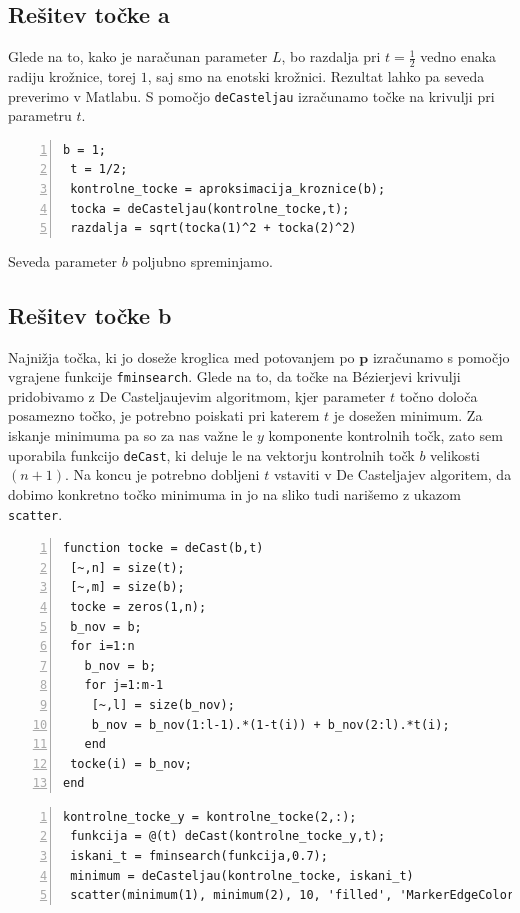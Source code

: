 \documentclass[a4paper,12pt]{article}
\begin{document}
	\subsection{Rešitev točke a}

	Glede na to, kako je naračunan parameter $L$, bo razdalja pri $t=\frac{1}{2}$ vedno enaka radiju krožnice, torej $1$, saj smo na enotski
	krožnici. Rezultat lahko pa seveda preverimo v Matlabu. S pomočjo \lstinline[style=Matlab-editor]!deCasteljau! izračunamo točke na krivulji pri
	parametru $t$.

	\begin{lstlisting}[style=Matlab-editor,	numbers=left,]
 b = 1;
 t = 1/2;
 kontrolne_tocke = aproksimacija_kroznice(b);
 tocka = deCasteljau(kontrolne_tocke,t);
 razdalja = sqrt(tocka(1)^2 + tocka(2)^2)
	\end{lstlisting}

	\noindent Seveda parameter $b$ poljubno spreminjamo. 

	\subsection{Rešitev točke b}
	Najnižja točka, ki jo doseže kroglica med potovanjem po $\boldsymbol{p}$ izračunamo s pomočjo vgrajene funkcije \lstinline[style=Matlab-editor]!fminsearch!. Glede na to, da točke na 
	B\'ezierjevi krivulji pridobivamo z De Casteljaujevim algoritmom, kjer parameter $t$ točno določa posamezno točko, je potrebno poiskati pri katerem $t$ je dosežen minimum. Za iskanje minimuma pa so
	za nas važne le $y$ komponente kontrolnih točk, zato sem uporabila funkcijo \lstinline[style=Matlab-editor]!deCast!, ki deluje le na vektorju kontrolnih točk $b$ velikosti $(n+1)$. Na koncu je potrebno dobljeni $t$ vstaviti v  
	De Casteljajev algoritem, da dobimo konkretno točko minimuma in jo na sliko tudi narišemo z ukazom \lstinline[style=Matlab-editor]!scatter!.

	\begin{lstlisting}[style=Matlab-editor,	numbers=left,]
function tocke = deCast(b,t)
 [~,n] = size(t);
 [~,m] = size(b);
 tocke = zeros(1,n);
 b_nov = b;
 for i=1:n
   b_nov = b;
   for j=1:m-1
    [~,l] = size(b_nov);
    b_nov = b_nov(1:l-1).*(1-t(i)) + b_nov(2:l).*t(i);
   end
 tocke(i) = b_nov;
end
\end{lstlisting}


	\begin{lstlisting}[style=Matlab-editor,	numbers=left,]
 kontrolne_tocke_y = kontrolne_tocke(2,:);
 funkcija = @(t) deCast(kontrolne_tocke_y,t);
 iskani_t = fminsearch(funkcija,0.7);
 minimum = deCasteljau(kontrolne_tocke, iskani_t)
 scatter(minimum(1), minimum(2), 10, 'filled', 'MarkerEdgeColor', 'k', 'MarkerFaceColor', 'g')
	\end{lstlisting}
	
\end{document}
